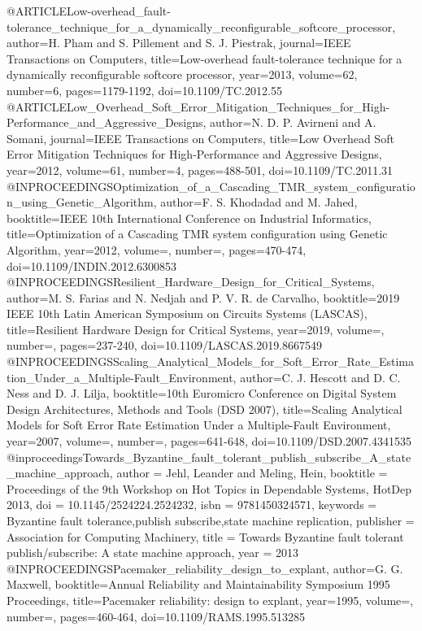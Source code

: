 @ARTICLE{Low-overhead_fault-tolerance_technique_for_a_dynamically_reconfigurable_softcore_processor,
	author={H. {Pham} and S. {Pillement} and S. J. {Piestrak}},
	journal={IEEE Transactions on Computers}, 
	title={Low-overhead fault-tolerance technique for a dynamically reconfigurable softcore processor}, 
	year={2013},
	volume={62},
	number={6},
	pages={1179-1192},	
	doi={10.1109/TC.2012.55}
}
@ARTICLE{Low_Overhead_Soft_Error_Mitigation_Techniques_for_High-Performance_and_Aggressive_Designs,
	author={N. D. P. {Avirneni} and A. {Somani}},
	journal={IEEE Transactions on Computers}, 
	title={Low Overhead Soft Error Mitigation Techniques for High-Performance and Aggressive Designs}, 
	year={2012},
	volume={61},
	number={4},
	pages={488-501},	
	doi={10.1109/TC.2011.31}
}
@INPROCEEDINGS{Optimization_of_a_Cascading_TMR_system_configuration_using_Genetic_Algorithm,
	author={F. S. {Khodadad} and M. {Jahed}},
	booktitle={IEEE 10th International Conference on Industrial Informatics}, 
	title={Optimization of a Cascading TMR system configuration using Genetic Algorithm}, 
	year={2012},
	volume={},
	number={},
	pages={470-474},	
	doi={10.1109/INDIN.2012.6300853}
}
@INPROCEEDINGS{Resilient_Hardware_Design_for_Critical_Systems,
	author={M. S. {Farias} and N. {Nedjah} and P. V. R. {de Carvalho}},
	booktitle={2019 IEEE 10th Latin American Symposium on Circuits   Systems (LASCAS)}, 
	title={Resilient Hardware Design for Critical Systems}, 
	year={2019},
	volume={},
	number={},
	pages={237-240},	
	doi={10.1109/LASCAS.2019.8667549}
}
@INPROCEEDINGS{Scaling_Analytical_Models_for_Soft_Error_Rate_Estimation_Under_a_Multiple-Fault_Environment,
	author={C. J. {Hescott} and D. C. {Ness} and D. J. {Lilja}},
	booktitle={10th Euromicro Conference on Digital System Design Architectures, Methods and Tools (DSD 2007)}, 
	title={Scaling Analytical Models for Soft Error Rate Estimation Under a Multiple-Fault Environment}, 
	year={2007},
	volume={},
	number={},
	pages={641-648},	
	doi={10.1109/DSD.2007.4341535}
}
@inproceedings{Towards_Byzantine_fault_tolerant_publish_subscribe_A_state_machine_approach,
	author = {Jehl, Leander and Meling, Hein},
	booktitle = {Proceedings of the 9th Workshop on Hot Topics in Dependable Systems, HotDep 2013},
	doi = {10.1145/2524224.2524232},
	isbn = {9781450324571},
	keywords = {Byzantine fault tolerance,publish subscribe,state machine replication},
	publisher = {Association for Computing Machinery},
	title = {{Towards Byzantine fault tolerant publish/subscribe: A state machine approach}},
	year = {2013}
}@INPROCEEDINGS{Pacemaker_reliability_design_to_explant,
	author={G. G. {Maxwell}},
	booktitle={Annual Reliability and Maintainability Symposium 1995 Proceedings}, 
	title={Pacemaker reliability: design to explant}, 
	year={1995},
	volume={},
	number={},
	pages={460-464},
	doi={10.1109/RAMS.1995.513285}
}
